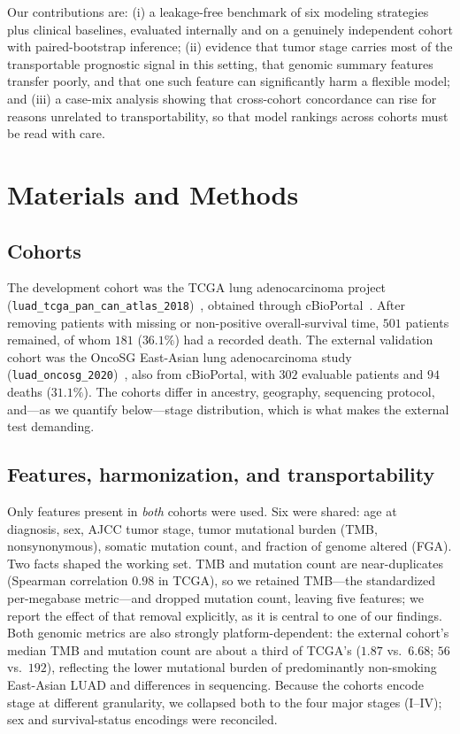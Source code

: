 \documentclass[journal]{IEEEtran}
\begin{document}
Our contributions are: (i) a leakage-free benchmark of six modeling strategies
plus clinical baselines, evaluated internally and on a genuinely independent
cohort with paired-bootstrap inference; (ii) evidence that tumor stage carries
most of the transportable prognostic signal in this setting, that genomic summary
features transfer poorly, and that one such feature can significantly harm a
flexible model; and (iii) a case-mix analysis showing that cross-cohort
concordance can rise for reasons unrelated to transportability, so that model
rankings across cohorts must be read with care.

\section{Materials and Methods}

\subsection{Cohorts}
The development cohort was the TCGA lung adenocarcinoma project
(\texttt{luad\_tcga\_pan\_can\_atlas\_2018})~\cite{tcga2014}, obtained through
cBioPortal~\cite{cbioportal2012}. After removing patients with missing or
non-positive overall-survival time, $501$ patients remained, of whom $181$
($36.1\%$) had a recorded death. The external validation cohort was the OncoSG
East-Asian lung adenocarcinoma study (\texttt{luad\_oncosg\_2020})~\cite{chen2020},
also from cBioPortal, with $302$ evaluable patients and $94$ deaths ($31.1\%$).
The cohorts differ in ancestry, geography, sequencing protocol, and---as we
quantify below---stage distribution, which is what makes the external test
demanding.

\subsection{Features, harmonization, and transportability}
Only features present in \emph{both} cohorts were used. Six were shared: age at
diagnosis, sex, AJCC tumor stage, tumor mutational burden (TMB, nonsynonymous),
somatic mutation count, and fraction of genome altered (FGA). Two facts shaped
the working set. TMB and mutation count are near-duplicates (Spearman
correlation $0.98$ in TCGA), so we retained TMB---the standardized
per-megabase metric---and dropped mutation count, leaving five features;
we report the effect of that removal explicitly, as it is central to one of our
findings. Both genomic metrics are also strongly platform-dependent: the external
cohort's median TMB and mutation count are about a third of TCGA's ($1.87$
vs.\ $6.68$; $56$ vs.\ $192$), reflecting the lower mutational burden of
predominantly non-smoking East-Asian LUAD and differences in sequencing. Because
the cohorts encode stage at different granularity, we collapsed both to the four
major stages (I--IV); sex and survival-status encodings were reconciled.
\end{document}
